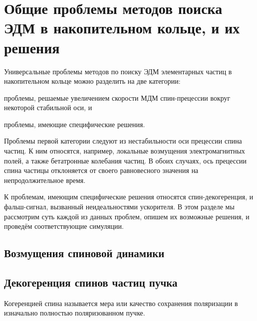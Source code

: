
\newcommand{\ux}{\hat{x}}
\newcommand{\uy}{\hat{y}}
\newcommand{\erredm}{\tilde\W_{EDM}}
\newcommand{\errmdm}{\tilde\W_{MDM}}

\chapter{Общие проблемы методов поиска ЭДМ в накопительном кольце, и их решения} \label{chpt3:top-level}
 
Универсальные проблемы методов по поиску ЭДМ элементарных частиц в накопительном кольце 
можно разделить на две категории:
\begin{enumerate*}
	\item проблемы, решаемые увеличением скорости МДМ спин-прецессии вокруг некоторой стабильной оси, и
	\item проблемы, имеющие специфические решения.
\end{enumerate*}

Проблемы первой категории следуют из нестабильности оси прецессии спина частиц. К ним относятся, например, 
локальные возмущения электромагнитных полей, а также бетатронные колебания частиц. 
В обоих случаях, ось прецессии спина частицы отклоняется от своего равновесного значения 
на непродолжительное время.

К проблемам, имеющим специфические решения относятся спин-декогеренция, и фальш-сигнал, вызванный 
неидеальностями ускорителя. В этом разделе мы рассмотрим суть каждой из данных проблем, 
опишем их возможные решения, и проведём соответствующие симуляции.
  
\section{Возмущения спиновой динамики}\label{chpt3:smp}


\section{Декогеренция спинов частиц пучка}\label{chpt3:decoherence}
Когеренцией спина называется мера или качество сохранения поляризации
в изначально полностью поляризованном пучке.~\cite[стр.~205]{Eremey:Thesis}

